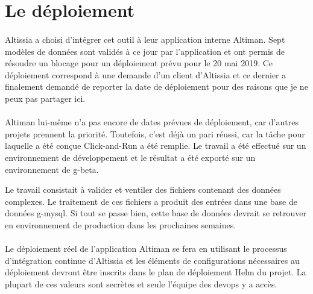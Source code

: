 \section{Le déploiement}
\label{sec:deployment}

\paragraph{}
Altissia a choisi d'intégrer cet outil à leur application interne Altiman\fnmark{}.
Sept modèles de données sont validés à ce jour par l'application et ont permis de résoudre un blocage pour un déploiement prévu pour le 20 mai 2019.
Ce déploiement correspond à une demande d'un client d'Altissia et ce dernier a finalement demandé de reporter la date de déploiement pour des raisons que je ne peux pas partager ici.

\paragraph{}
Altiman lui-même n'a pas encore de dates prévues de déploiement, car d'autres projets prennent la priorité.
Toutefois, c'est déjà un pari réussi, car la tâche pour laquelle a été conçue Click-and-Run a été remplie.
Le travail a été effectué sur un environnement de développement et le résultat a été exporté sur un environnement de \gls{g-beta}.

Le travail consistait à valider et ventiler des fichiers contenant des données complexes.
Le traitement de ces fichiers a produit des entrées dans une base de données \gls{g-mysql}.
Si tout se passe bien, cette base de données devrait se retrouver en environnement de production dans les prochaines semaines.

\paragraph{}
Le déploiement réel de l'application Altiman se fera en utilisant le processus d'intégration continue d'Altissia et les éléments de configurations nécessaires au déploiement devront être inscrits dans le plan de déploiement Helm\fnmark{} du projet.
La plupart de ces valeurs sont secrètes et seule l'équipe des devops\fnmark{} y a accès.
